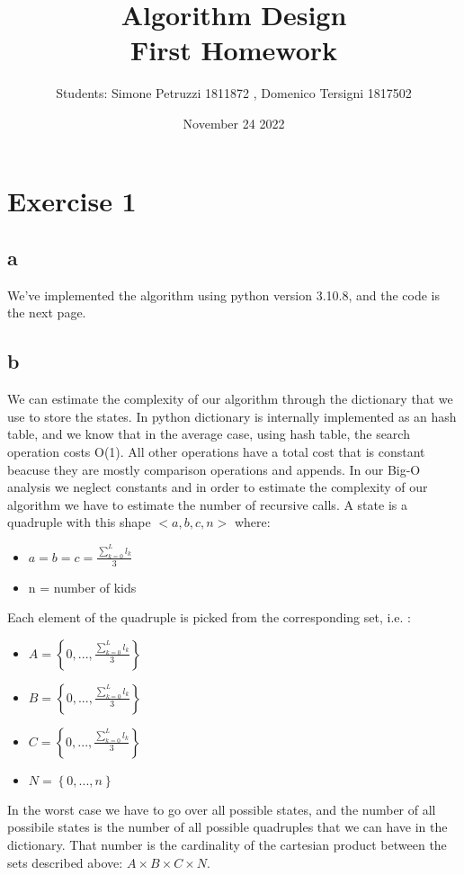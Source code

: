 \documentclass{article}
\title{\textbf{Algorithm Design}\\
	   First Homework}
\author{Students: Simone Petruzzi 1811872 , Domenico Tersigni 1817502}
\date{November 24 2022}
\begin{document}
\maketitle
\newpage

\section{Exercise 1}
\subsection{a}
We've implemented the algorithm using python version 3.10.8, and the code is the next page.
\subsection{b}
We can estimate the complexity of our algorithm through the dictionary that we use to store the states. In python dictionary is internally implemented as an hash table, and we know that in the average case, using hash table, the search operation costs O(1). All other operations have a total cost that is constant beacuse they are mostly comparison operations and appends. In our Big-O analysis we neglect constants and in order to estimate the complexity of our algorithm we have to estimate the number of recursive calls. A state is a quadruple with this shape $<a,b,c,n>$ where:
\begin{itemize}
\item $a=b=c=\frac{\sum_{k=0}^{L} l_{k}}{3}$
\item n = number of kids
\end{itemize}
Each element of the quadruple is picked from the corresponding set, i.e. :
\begin{itemize}
\item $A = \left \{0, ... , \frac{\sum_{k=0}^{L} l_{k}}{3}  \right \}$
\item $B = \left \{0, ... , \frac{\sum_{k=0}^{L} l_{k}}{3}  \right \}$
\item $C = \left \{0, ... , \frac{\sum_{k=0}^{L} l_{k}}{3}  \right \}$
\item $N = \left \{0, ... , n \right \}$
\end{itemize}
 In the worst case we have to go over all possible states, and the number of all possibile states is the number of all possible quadruples that we can have in the dictionary. That number is the cardinality of the cartesian product between the sets described above: $A\times B \times C \times N$.
\end{document}
